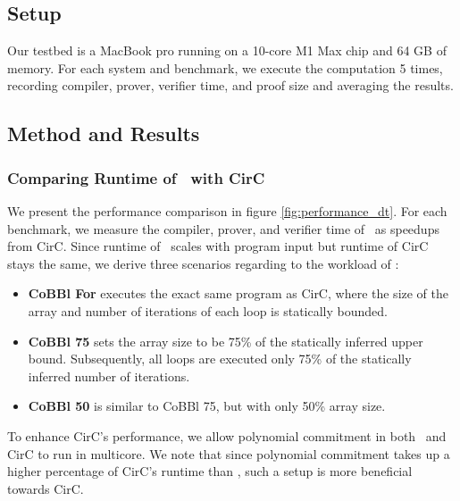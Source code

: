 

\subsection{Setup}
Our testbed is a MacBook pro running on a 10-core M1 Max chip and 64 GB of memory. For each system and benchmark, we execute the computation 5 times, recording compiler, prover, verifier time, and proof size and averaging the results. 

\subsection{Method and Results}
\subsubsection{Comparing Runtime of \CoBBl~with CirC}
We present the performance comparison in figure \ref{fig:performance_dt}.  For each benchmark, we measure the compiler, prover, and verifier time of \CoBBl~as speedups from CirC. Since runtime of \CoBBl~scales with program input but runtime of CirC stays the same, we derive three scenarios regarding to the workload of \CoBBl:
\begin{itemize}
  \item \textbf{CoBBl For} executes the exact same program as CirC, where the size of the array and number of iterations of each loop is statically bounded.
  \item \textbf{CoBBl 75} sets the array size to be 75\% of the statically inferred upper bound. Subsequently, all loops are executed only 75\% of the statically inferred number of iterations. 
  \item \textbf{CoBBl 50} is similar to CoBBl 75, but with only 50\% array size.
\end{itemize}

To enhance CirC's performance, we allow polynomial commitment in both \CoBBl~and CirC to run in multicore. We note that since polynomial commitment takes up a higher percentage of CirC's runtime than \CoBBl, such a setup is more beneficial towards CirC.

